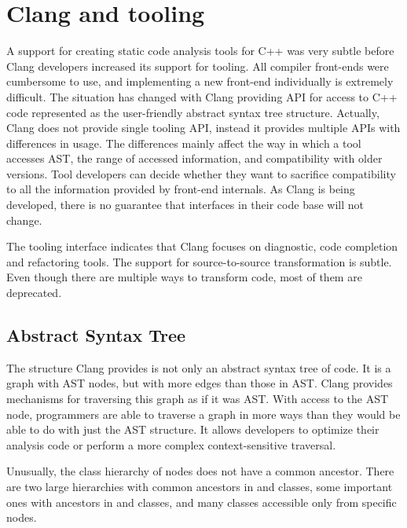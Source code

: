 \chapter{Clang and tooling}
\label{chapter-clang}
A support for creating static code analysis tools for C++ was very subtle before Clang developers increased its support for tooling. All compiler front-ends were cumbersome to use, and implementing a new front-end individually is extremely difficult. The situation has changed with Clang providing API for access to C++ code represented as the user-friendly abstract syntax tree structure. Actually, Clang does not provide single tooling API, instead it provides multiple APIs with differences in usage. The differences mainly affect the way in which a tool accesses AST, the range of accessed information, and compatibility with older versions. Tool developers can decide whether they want to sacrifice compatibility to all the information provided by front-end internals. As Clang is being developed, there is no guarantee that interfaces in their code base will not change.

The tooling interface indicates that Clang focuses on diagnostic, code completion and refactoring tools. The support for source-to-source transformation is subtle. Even though there are multiple ways to transform code, most of them are deprecated.

\section{Abstract Syntax Tree}
The structure Clang provides is not only an abstract syntax tree of code. It is a graph with AST nodes, but with more edges than those in AST. Clang provides mechanisms for traversing this graph as if it was AST. With access to the AST node, programmers are able to traverse a graph in more ways than they would be able to do with just the AST structure. It allows developers to optimize their analysis code or perform a more complex context-sensitive traversal.

Unusually, the class hierarchy of nodes does not have a common ancestor. There are two large hierarchies with common ancestors in  and  classes, some important ones with ancestors in  and  classes, and many classes accessible only from specific nodes.

